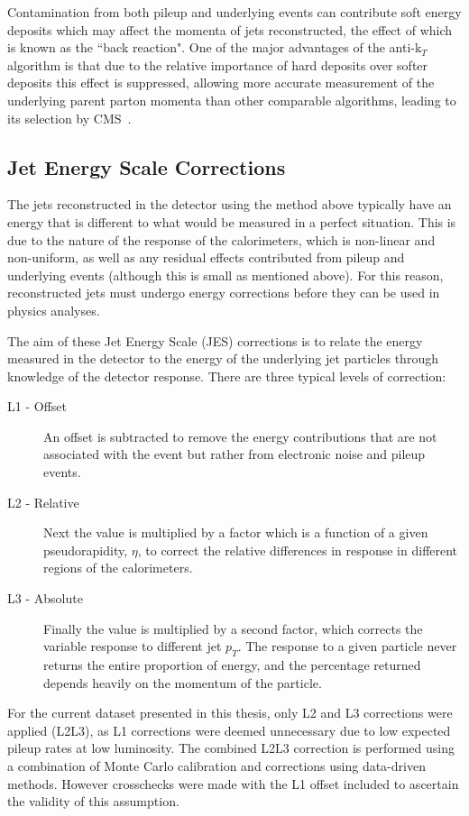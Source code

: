 Contamination from both pileup and underlying events can contribute soft energy deposits which may affect the momenta of jets reconstructed, the effect of which is known as the ``back reaction". One of the major advantages of the anti-k$_{T}$ algorithm is that due to the relative importance of hard deposits over softer deposits this effect is suppressed, allowing more accurate measurement of the underlying parent parton momenta than other comparable algorithms, leading to its selection by CMS~\cite{aktrecom}.


\subsection{Jet Energy Scale Corrections}
\label{sec:JES}
The jets reconstructed in the detector using the method above typically have an energy that is different to what would be measured in a perfect situation. This is due to the nature of the response of the calorimeters, which is non-linear and non-uniform, as well as any residual effects contributed from pileup and underlying events (although this is small as mentioned above). For this reason, reconstructed jets must undergo energy corrections before they can be used in physics analyses. 

The aim of these Jet Energy Scale (JES) corrections is to relate the energy measured in the detector to the energy of the underlying jet particles through knowledge of the detector response. There are three typical levels of correction:

\begin{description}
\item[L1 - Offset]{An offset is subtracted to remove the energy contributions that are not associated with the event but rather from electronic noise and pileup events.  }
\item[L2 - Relative]{Next the value is multiplied by a factor which is a function of a given pseudorapidity, $\eta$, to correct the relative differences in response in different regions of the calorimeters.}
\item [L3 - Absolute]{Finally the value is multiplied by a second factor, which corrects the variable response to different jet $p_{T}$. The response to a given particle never returns the entire proportion of energy, and the percentage returned depends heavily on the momentum of the particle.}
\end{description}

For the current dataset presented in this thesis, only L2 and L3 corrections were applied (L2L3), as L1 corrections were deemed unnecessary due to low expected pileup rates at low luminosity. The combined L2L3 correction is performed using a combination of Monte Carlo calibration and corrections using data-driven methods. However crosschecks were made with the L1 offset included to ascertain the validity of this assumption.

